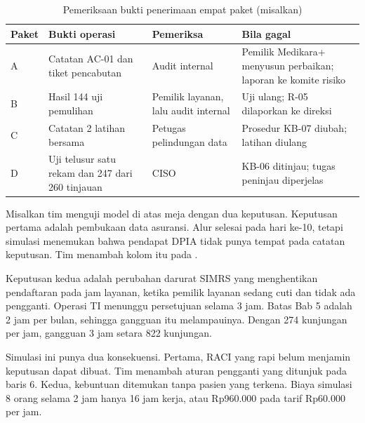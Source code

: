 \begin{table}[!htb]
  \centering\small
  \caption{Pemeriksaan bukti penerimaan empat paket (misalkan)}\label{tab:ch08-bukti}
  \begin{tabularx}{\textwidth}{|>{\raggedright\arraybackslash}p{}|>{\raggedright\arraybackslash}X|>{\raggedright\arraybackslash}p{}|>{\raggedright\arraybackslash}X|}
    \hline
    \textbf{Paket} & \textbf{Bukti operasi} & \textbf{Pemeriksa} & \textbf{Bila gagal} \\ \hline
    A & Catatan AC-01 dan tiket pencabutan & Audit internal & Pemilik Medikara+ menyusun perbaikan;
    laporan ke komite risiko \\ \hline
    B & Hasil 144 uji pemulihan & Pemilik layanan, lalu audit internal & Uji ulang; R-05
    dilaporkan ke direksi \\ \hline
    C & Catatan 2 latihan bersama & Petugas pelindungan data & Prosedur KB-07 diubah; latihan
    diulang \\ \hline
    D & Uji telusur satu rekam dan 247 dari 260 tinjauan & CISO & KB-06 ditinjau; tugas peninjau
    diperjelas \\ \hline
  \end{tabularx}
\end{table}

\begin{kasus}[title={Kasus Medikara Health: Menguji Model dengan Dua Keputusan}]
Misalkan tim menguji model di atas meja dengan dua keputusan. Keputusan pertama adalah pembukaan
data asuransi. Alur selesai pada hari ke-10, tetapi simulasi menemukan bahwa pendapat DPIA tidak
punya tempat pada catatan keputusan. Tim menambah kolom itu pada
.

Keputusan kedua adalah perubahan darurat SIMRS yang menghentikan pendaftaran pada jam layanan,
ketika pemilik layanan sedang cuti dan tidak ada pengganti. Operasi TI menunggu persetujuan selama
3 jam. Batas Bab 5 adalah 2 jam per bulan, sehingga gangguan itu melampauinya. Dengan 274 kunjungan
per jam, gangguan 3 jam setara 822 kunjungan.

Simulasi ini punya dua konsekuensi. Pertama, RACI yang rapi belum menjamin keputusan dapat dibuat.
Tim menambah aturan pengganti yang ditunjuk pada baris 6. Kedua, kebuntuan ditemukan tanpa pasien
yang terkena. Biaya simulasi 8 orang selama 2 jam hanya 16 jam kerja, atau Rp960.000 pada tarif
Rp60.000 per jam.
\end{kasus}

